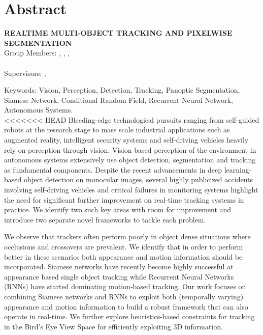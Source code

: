 \chapter*{Abstract}

\begin{center}
	\vspace{5mm}
	\MakeUppercase{\textbf{Realtime Multi-Object Tracking and Pixelwise Segmentation}}\\
	\vspace{5mm}
	Group Members: \memberA, \memberB, \memberC, \\ \memberD \\
	\vspace{5mm}
	Supervisors: \supervisorA, \supervisorB \\
	\vspace{5mm}
\end{center}

\noindent Keywords: Vision, Perception, Detection, Tracking, Panoptic Segmentation, Siamese Network, Conditional Random Field, Recurrent Neural Network, Autonomous Systems. \\

<<<<<<< HEAD
Bleeding-edge technological pursuits ranging from self-guided robots at the research stage to mass scale industrial applications such as augmented reality, intelligent security systems and self-driving vehicles heavily rely on perception through vision. Vision based perception of the environment in autonomous systems extensively use object detection, segmentation and tracking as fundamental components. Despite the recent advancements in deep learning-based object detection on monocular images, several highly publicized accidents involving self-driving vehicles and critical failures in monitoring systems highlight the need for significant further improvement on real-time tracking systems in practice. We identify two such key areas with room for improvement and introduce two separate novel frameworks to tackle each problem. 

We observe that trackers often perform poorly in object dense situations where occlusions and crossovers are prevalent. We identify that in order to perform better in these scenarios both appearance and motion information should be incorporated. Siamese networks have recently become highly successful at appearance based single object tracking while Recurrent Neural Networks (RNNs) have started dominating motion-based tracking. Our work focuses on combining Siamese networks and RNNs to exploit both (temporally varying) appearance and motion information to build a robust framework that can also operate in real-time. We further explore heuristics-based constraints for tracking in the Bird’s Eye View Space for efficiently exploiting 3D information.

